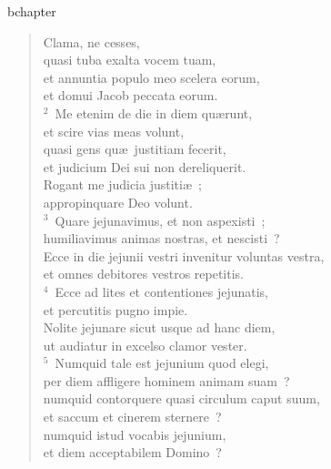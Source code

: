 bchapter\begin{verse}\vspace{-19pt}Clama, ne cesses,\\ quasi tuba exalta vocem tuam,\\ et annuntia populo meo scelera eorum,\\ et domui Jacob peccata eorum.\\
${}^{2}$~Me etenim de die in diem qu\ae runt,\\ et scire vias meas volunt,\\ quasi gens qu\ae\ justitiam fecerit,\\ et judicium Dei sui non dereliquerit.\\ Rogant me judicia justiti\ae~;\\ appropinquare Deo volunt.\\
${}^{3}$~Quare jejunavimus, et non aspexisti~;\\ humiliavimus animas nostras, et nescisti~?\\ Ecce in die jejunii vestri invenitur voluntas vestra,\\ et omnes debitores vestros repetitis.\\
${}^{4}$~Ecce ad lites et contentiones jejunatis,\\ et percutitis pugno impie.\\ Nolite jejunare sicut usque ad hanc diem,\\ ut audiatur in excelso clamor vester.\\
${}^{5}$~Numquid tale est jejunium quod elegi,\\ per diem affligere hominem animam suam~?\\ numquid contorquere quasi circulum caput suum,\\ et saccum et cinerem sternere~?\\ numquid istud vocabis jejunium,\\ et diem acceptabilem Domino~?\end{verse}


